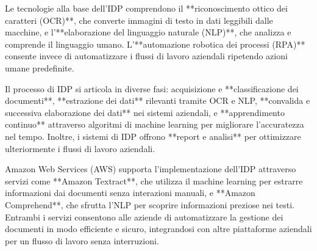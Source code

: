 Le tecnologie alla base dell'IDP comprendono il **riconoscimento ottico dei caratteri (OCR)**, che converte immagini di testo in dati leggibili dalle macchine, e l'**elaborazione del linguaggio naturale (NLP)**, che analizza e comprende il linguaggio umano. L'**automazione robotica dei processi (RPA)** consente invece di automatizzare i flussi di lavoro aziendali ripetendo azioni umane predefinite.

Il processo di IDP si articola in diverse fasi: acquisizione e **classificazione dei documenti**, **estrazione dei dati** rilevanti tramite OCR e NLP, **convalida e successiva elaborazione dei dati** nei sistemi aziendali, e **apprendimento continuo** attraverso algoritmi di machine learning per migliorare l'accuratezza nel tempo. Inoltre, i sistemi di IDP offrono **report e analisi** per ottimizzare ulteriormente i flussi di lavoro aziendali.

Amazon Web Services (AWS) supporta l'implementazione dell'IDP attraverso servizi come **Amazon Textract**, che utilizza il machine learning per estrarre informazioni dai documenti senza interazioni manuali, e **Amazon Comprehend**, che sfrutta l'NLP per scoprire informazioni preziose nei testi. Entrambi i servizi consentono alle aziende di automatizzare la gestione dei documenti in modo efficiente e sicuro, integrandosi con altre piattaforme aziendali per un flusso di lavoro senza interruzioni.


%
%
%
